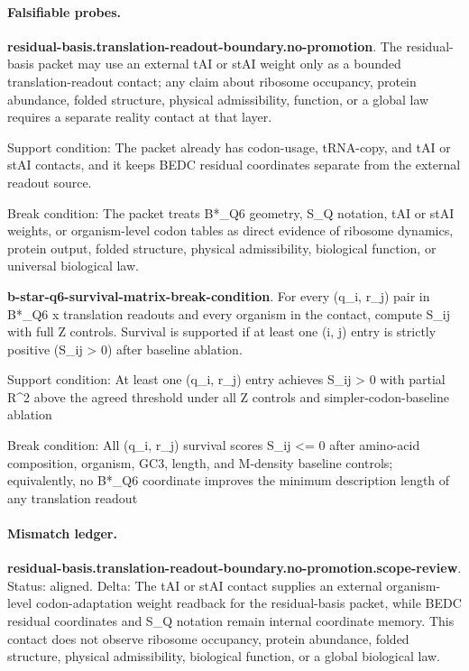\paragraph{Falsifiable probes.}
\textbf{residual-basis.translation-readout-boundary.no-promotion}. The residual-basis packet may use an external tAI or stAI weight only as a bounded translation-readout contact; any claim about ribosome occupancy, protein abundance, folded structure, physical admissibility, function, or a global law requires a separate reality contact at that layer.

Support condition: The packet already has codon-usage, tRNA-copy, and tAI or stAI contacts, and it keeps BEDC residual coordinates separate from the external readout source.

Break condition: The packet treats B*\_Q6 geometry, S\_Q notation, tAI or stAI weights, or organism-level codon tables as direct evidence of ribosome dynamics, protein output, folded structure, physical admissibility, biological function, or universal biological law.

\textbf{b-star-q6-survival-matrix-break-condition}. For every (q\_i, r\_j) pair in B*\_Q6 x translation readouts and every organism in the contact, compute S\_ij with full Z controls. Survival is supported if at least one (i, j) entry is strictly positive (S\_ij > 0) after baseline ablation.

Support condition: At least one (q\_i, r\_j) entry achieves S\_ij > 0 with partial R\textasciicircum{}2 above the agreed threshold under all Z controls and simpler-codon-baseline ablation

Break condition: All (q\_i, r\_j) survival scores S\_ij <= 0 after amino-acid composition, organism, GC3, length, and M-density baseline controls; equivalently, no B*\_Q6 coordinate improves the minimum description length of any translation readout

\paragraph{Mismatch ledger.}
\textbf{residual-basis.translation-readout-boundary.no-promotion.scope-review}. Status: aligned. Delta: The tAI or stAI contact supplies an external organism-level codon-adaptation weight readback for the residual-basis packet, while BEDC residual coordinates and S\_Q notation remain internal coordinate memory. This contact does not observe ribosome occupancy, protein abundance, folded structure, physical admissibility, biological function, or a global biological law.

